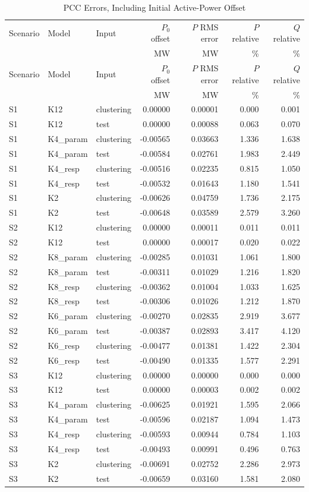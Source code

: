 \begin{longtable}{lllrrrr}
\caption{PCC Errors, Including Initial Active-Power Offset}\label{tab:all-time}\\
\toprule Scenario & Model & Input & $P_0$ offset & $P$ RMS error & $P$ relative & $Q$ relative\\
 & & & MW & MW & \% & \%\\\midrule\endfirsthead
\toprule Scenario & Model & Input & $P_0$ offset & $P$ RMS error & $P$ relative & $Q$ relative\\
 & & & MW & MW & \% & \%\\\midrule\endhead
S1 & K12 & clustering & 0.00000 & 0.00001 & 0.000 & 0.001 \\
S1 & K12 & test & 0.00000 & 0.00088 & 0.063 & 0.070 \\
S1 & K4\_param & clustering & -0.00565 & 0.03663 & 1.336 & 1.638 \\
S1 & K4\_param & test & -0.00584 & 0.02761 & 1.983 & 2.449 \\
S1 & K4\_resp & clustering & -0.00516 & 0.02235 & 0.815 & 1.050 \\
S1 & K4\_resp & test & -0.00532 & 0.01643 & 1.180 & 1.541 \\
S1 & K2 & clustering & -0.00626 & 0.04759 & 1.736 & 2.175 \\
S1 & K2 & test & -0.00648 & 0.03589 & 2.579 & 3.260 \\
S2 & K12 & clustering & 0.00000 & 0.00011 & 0.011 & 0.011 \\
S2 & K12 & test & 0.00000 & 0.00017 & 0.020 & 0.022 \\
S2 & K8\_param & clustering & -0.00285 & 0.01031 & 1.061 & 1.800 \\
S2 & K8\_param & test & -0.00311 & 0.01029 & 1.216 & 1.820 \\
S2 & K8\_resp & clustering & -0.00362 & 0.01004 & 1.033 & 1.625 \\
S2 & K8\_resp & test & -0.00306 & 0.01026 & 1.212 & 1.870 \\
S2 & K6\_param & clustering & -0.00270 & 0.02835 & 2.919 & 3.677 \\
S2 & K6\_param & test & -0.00387 & 0.02893 & 3.417 & 4.120 \\
S2 & K6\_resp & clustering & -0.00477 & 0.01381 & 1.422 & 2.304 \\
S2 & K6\_resp & test & -0.00490 & 0.01335 & 1.577 & 2.291 \\
S3 & K12 & clustering & 0.00000 & 0.00000 & 0.000 & 0.000 \\
S3 & K12 & test & 0.00000 & 0.00003 & 0.002 & 0.002 \\
S3 & K4\_param & clustering & -0.00625 & 0.01921 & 1.595 & 2.066 \\
S3 & K4\_param & test & -0.00596 & 0.02187 & 1.094 & 1.473 \\
S3 & K4\_resp & clustering & -0.00593 & 0.00944 & 0.784 & 1.103 \\
S3 & K4\_resp & test & -0.00493 & 0.00991 & 0.496 & 0.763 \\
S3 & K2 & clustering & -0.00691 & 0.02752 & 2.286 & 2.973 \\
S3 & K2 & test & -0.00659 & 0.03160 & 1.581 & 2.080 \\
\bottomrule\end{longtable}
